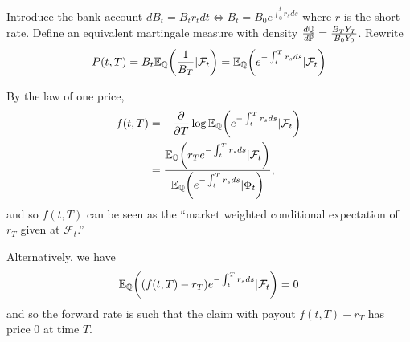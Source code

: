 Introduce the bank account $dB_{t} = B_{t} r_{t} dt \iff B_{t} = B_{0}
e^{\int_{0}^{t}r_{s} ds}$ where $r$ is the short rate.  Define an
equivalent martingale measure with density $\frac{d\Q}{d\Prob} =
\frac{B_{T} Y_{T}}{B_{0} Y_{0}}$.  Rewrite
\begin{align}
  \label{eq:149}
  P(t, T) = B_{t} \E{\frac{1}{B_{T}} | \mathcal{F}_{t}}{\Q} =
  \E{e^{-\int_{t}^{T} r_{s} ds} | \mathcal{F}_{t}}{\Q}
\end{align}

By the law of one price,
\begin{align}
  \label{eq:150}
  f(t, T) &= - \frac{\partial}{\partial T} \log \E{ e^{-\int_{t}^{T}
      r_{s} ds} | \mathcal{F}_{t}}{\Q} \\
  &= \frac{\E{r_{T} e^{-\int_{t}^{T} r_{s} ds} |
      \mathcal{F}_{t}}{\Q}}{\E{e^{-\int_{t}^{T} r_{s} ds} |
      \Phi_{t}}{\Q}},
\end{align} and so $f(t, T)$ can be seen as the ``market weighted
conditional expectation of $r_{T}$ given at $\mathcal{F}_{t}$.''

Alternatively, we have
\begin{align}
  \label{eq:151}
  \E{(f(t, T) - r_{T}) e^{-\int_{t}^{T} r_{s} ds} |
    \mathcal{F}_{t}}{\Q} = 0
\end{align} and so the forward rate is such that the claim with payout
$f(t, T) - r_{T}$ has price 0 at time $T$.


